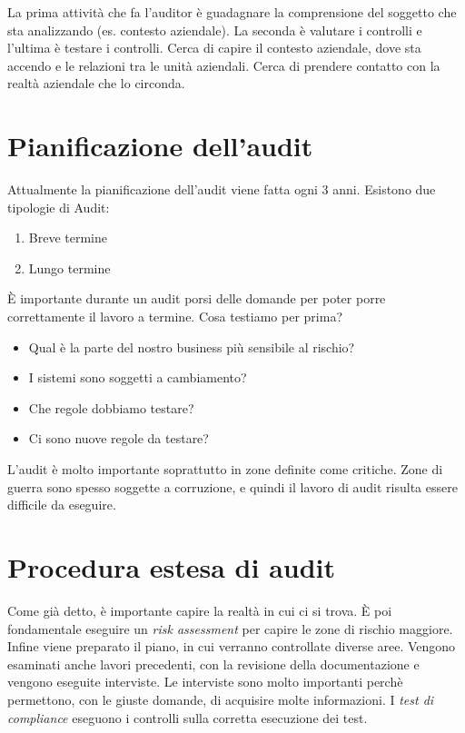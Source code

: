 La prima attività che fa l'auditor è guadagnare la comprensione del soggetto che 
sta analizzando (es. contesto aziendale).
La seconda è valutare i controlli e l'ultima è testare i controlli.
Cerca di capire il contesto aziendale, dove sta accendo e le relazioni tra le 
unità aziendali. Cerca di prendere contatto con la realtà aziendale che lo 
circonda.

\section{Pianificazione dell'audit}

Attualmente la pianificazione dell'audit viene fatta ogni 3 anni.
Esistono due tipologie di Audit:
\begin{enumerate}
\item Breve termine 
\item Lungo termine

\end{enumerate}

È importante durante un audit porsi delle domande per poter porre correttamente 
il lavoro a termine.
Cosa testiamo per prima?
\begin{itemize}
\item Qual è la parte del nostro business più sensibile al rischio?
\item I sistemi sono soggetti a cambiamento?
\item Che regole dobbiamo testare?
\item Ci sono nuove regole da testare?
\end{itemize}


L'audit è molto importante soprattutto in zone definite come critiche. Zone di 
guerra sono spesso soggette a corruzione, e quindi il lavoro di audit risulta 
essere difficile da eseguire.


\section{Procedura estesa di audit}

Come già detto, è importante capire la realtà in cui ci si trova. È poi 
fondamentale eseguire un \textit{risk assessment} per capire le zone di rischio 
maggiore.
Infine viene preparato il piano, in cui verranno controllate diverse aree. 
Vengono esaminati anche lavori precedenti, con la revisione della documentazione 
e vengono eseguite interviste. Le interviste sono molto importanti perchè 
permettono, con le giuste domande, di acquisire molte informazioni.
I \textit{test di compliance} eseguono i controlli sulla corretta esecuzione dei 
test.

